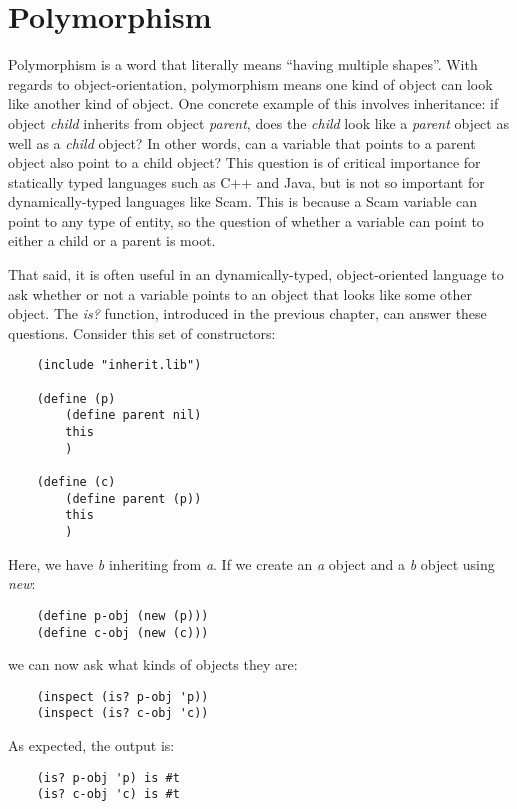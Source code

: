 {{\section{Polymorphism}

Polymorphism is a word that literally means ``having multiple shapes''.
With regards to object-orientation, polymorphism means one kind of object
can look like another kind of object. One concrete example of this
involves inheritance: if object {\it child} inherits from object {\it parent},
does the {\it child} look like a {\it parent} object
as well as a {\it child} object? In
other words, can a variable that points to a parent object also
point to a child object? This question is of critical importance
for statically typed languages such as C++ and Java, but is not
so important for dynamically-typed languages like Scam.
This is because a Scam variable can point to any type of entity,
so the question of whether a variable can point to either a child
or a parent is moot.

That said, it is often useful in an dynamically-typed, object-oriented
language to ask whether or not a variable points to an object that
looks like some other object. The {\it is?} function, introduced in the
previous chapter, can answer these questions. Consider this set
of constructors:

\begin{verbatim}
    (include "inherit.lib")

    (define (p)
        (define parent nil)
        this
        )

    (define (c)
        (define parent (p))
        this
        )
\end{verbatim}

Here, we have {\it b} inheriting from {\it a}.
If we create an {\it a} object and a {\it b} object using {\it new}:

\begin{verbatim}
    (define p-obj (new (p)))
    (define c-obj (new (c)))
\end{verbatim}

we can now ask what kinds of objects they are:

\begin{verbatim}
    (inspect (is? p-obj 'p))
    (inspect (is? c-obj 'c))
\end{verbatim}

As expected, the output is:

\begin{verbatim}
    (is? p-obj 'p) is #t
    (is? c-obj 'c) is #t
\end{verbatim}

}}
